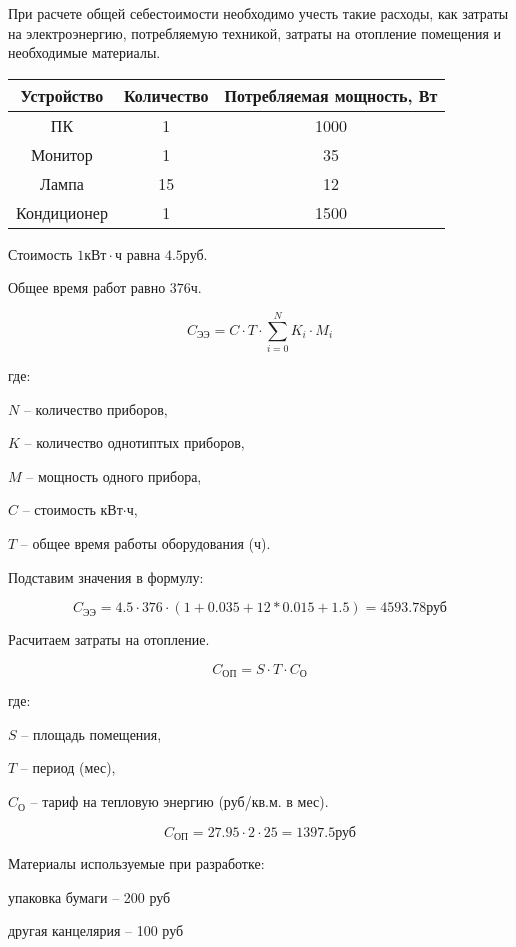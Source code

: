 При расчете общей себестоимости необходимо учесть такие расходы,
как затраты на электроэнергию, потребляемую техникой, затраты на
отопление помещения и необходимые материалы.

\vspace{1em}

\begin{tabular}{|c|c|c|}
\hline
Устройство & Количество & Потребляемая мощность, Вт \\
\hline
ПК & 1 & 1000 \\
\hline
Монитор & 1 & 35 \\
\hline
Лампа & 15 & 12 \\
\hline
Кондиционер & 1 & 1500 \\
\hline
\end{tabular}

\vspace{1em}

Стоимость $1\text{кВт} \cdot \text{ч}$ равна $4.5\text{руб}$.

Общее время работ равно $376\text{ч}$.

$$ C_\text{ЭЭ} = C \cdot T \cdot \sum_{i=0}^N K_i \cdot M_i $$

где:

$N$ -- количество приборов,

$K$ -- количество однотиптых приборов,

$M$ -- мощность одного прибора,

$C$ -- стоимость кВт$\cdot$ч,

$T$ -- общее время работы оборудования (ч).

Подставим значения в формулу:

$$ C_\text{ЭЭ} = 4.5 \cdot 376 \cdot (1 + 0.035 + 12 * 0.015 + 1.5) = 4593.78 \text{руб} $$

\vspace{1em}

Расчитаем затраты на отопление.

$$ C_\text{ОП} = S \cdot T \cdot C_\text{О} $$

где: 

$S$ -- площадь помещения,

$T$ -- период (мес),

$C_\text{О}$ -- тариф на тепловую энергию (руб/кв.м. в мес).

$$ C_\text{ОП} = 27.95 \cdot 2 \cdot 25 = 1397.5 \text{руб} $$

\vspace{1em}

Материалы используемые при разработке: 
\begin{mintemize}
\item упаковка бумаги -- 200 руб
\item другая канцелярия -- 100 руб
\end{mintemize}

